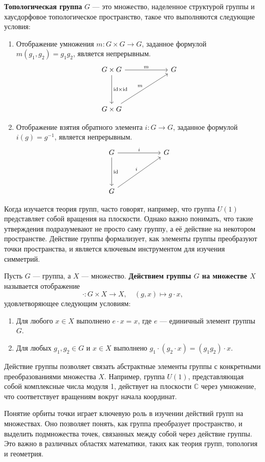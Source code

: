 \begin{definition}
	\textbf{Топологическая группа} $ G $ — это множество, наделенное структурой группы и хаусдорфовое топологическое пространство, такое что выполняются следующие условия:
	\begin{enumerate}
		\item Отображение умножения $ m: G \times G \to G $, заданное формулой $ m(g_1, g_2) = g_1 g_2 $, является непрерывным.
		\[
		\begin{tikzcd}[row sep=40pt, column sep=60pt]
			G \times G \arrow{r}{m} \arrow{d}{\mathrm{id} \times \mathrm{id}} & G \\
			G \times G \arrow{ur}{m}
		\end{tikzcd}
		\]
		\item Отображение взятия обратного элемента $ i: G \to G $, заданное формулой $ i(g) = g^{-1} $, является непрерывным.
		\[
		\begin{tikzcd}[row sep=40pt, column sep=60pt]
			G \arrow{r}{i} \arrow{d}{\mathrm{id}} & G \\
			G \arrow{ur}{i}
		\end{tikzcd}
		\]
	\end{enumerate}
	\end{definition}
	Когда изучается теория групп, часто говорят, например, что группа $ U(1) $ представляет собой вращения на плоскости. Однако важно понимать, что такие утверждения подразумевают не просто саму группу, а её {действие} на некотором пространстве. Действие группы формализует, как элементы группы преобразуют точки пространства, и является ключевым инструментом для изучения симметрий.

\begin{definition}
Пусть $ G $ — группа, а $ X $ — множество. \textbf{Действием группы $ G $ на множестве $ X $} называется отображение
\[
\cdot : G \times X \to X, \quad (g, x) \mapsto g \cdot x,
\]
удовлетворяющее следующим условиям:
\begin{enumerate}
    \item Для любого $ x \in X $ выполнено $ e \cdot x = x $, где $ e $ — единичный элемент группы $ G $.
    \item Для любых $ g_1, g_2 \in G $ и $ x \in X $ выполнено $ g_1 \cdot (g_2 \cdot x) = (g_1 g_2) \cdot x $.
\end{enumerate}
\end{definition}
\begin{remark}
	Действие группы позволяет связать абстрактные элементы группы с конкретными преобразованиями множества $ X $. Например, группа $ U(1) $, представляющая собой комплексные числа модуля 1, действует на плоскости $ \mathbb{C} $ через умножение, что соответствует вращениям вокруг начала координат.
	\end{remark}
	Понятие орбиты точки играет ключевую роль в изучении действий групп на множествах. Оно позволяет понять, как группа преобразует пространство, и выделить подмножества точек, связанных между собой через действие группы. Это важно в различных областях математики, таких как теория групп, топология и геометрия.

